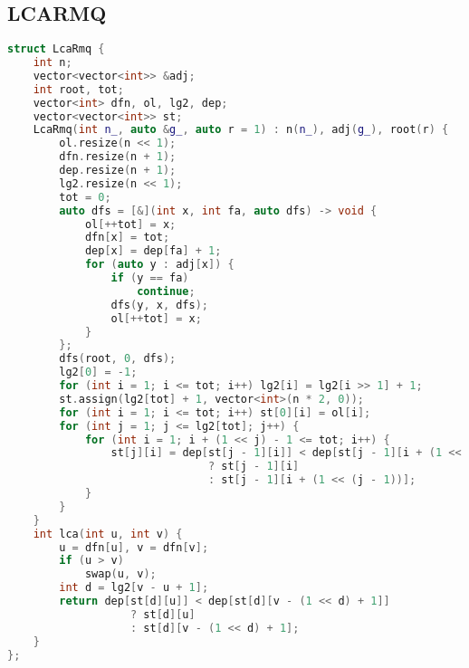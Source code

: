 \subsection{LCARMQ}
\begin{lstlisting}[language=C++]
struct LcaRmq {
    int n;
    vector<vector<int>> &adj;
    int root, tot;
    vector<int> dfn, ol, lg2, dep;
    vector<vector<int>> st;
    LcaRmq(int n_, auto &g_, auto r = 1) : n(n_), adj(g_), root(r) {
        ol.resize(n << 1);
        dfn.resize(n + 1);
        dep.resize(n + 1);
        lg2.resize(n << 1);
        tot = 0;
        auto dfs = [&](int x, int fa, auto dfs) -> void {
            ol[++tot] = x;
            dfn[x] = tot;
            dep[x] = dep[fa] + 1;
            for (auto y : adj[x]) {
                if (y == fa)
                    continue;
                dfs(y, x, dfs);
                ol[++tot] = x;
            }
        };
        dfs(root, 0, dfs);
        lg2[0] = -1;
        for (int i = 1; i <= tot; i++) lg2[i] = lg2[i >> 1] + 1;
        st.assign(lg2[tot] + 1, vector<int>(n * 2, 0));
        for (int i = 1; i <= tot; i++) st[0][i] = ol[i];
        for (int j = 1; j <= lg2[tot]; j++) {
            for (int i = 1; i + (1 << j) - 1 <= tot; i++) {
                st[j][i] = dep[st[j - 1][i]] < dep[st[j - 1][i + (1 << (j - 1))]]
                               ? st[j - 1][i]
                               : st[j - 1][i + (1 << (j - 1))];
            }
        }
    }
    int lca(int u, int v) {
        u = dfn[u], v = dfn[v];
        if (u > v)
            swap(u, v);
        int d = lg2[v - u + 1];
        return dep[st[d][u]] < dep[st[d][v - (1 << d) + 1]]
                   ? st[d][u]
                   : st[d][v - (1 << d) + 1];
    }
};
\end{lstlisting}
